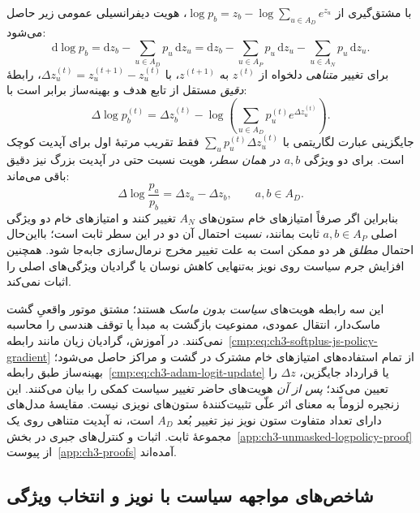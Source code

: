 با مشتق‌گیری از
$\log p_b=z_b-\log\sum_{u\in A_D}e^{z_u}$،
هویت دیفرانسیلی عمومی زیر حاصل می‌شود:
\begin{equation}\label{cmp:eq:ch3-noise-logpolicy-differential}
\boxed{
\mathrm d\log p_b=\mathrm dz_b-
\sum_{u\in A_D}p_u\,\mathrm dz_u
=\mathrm dz_b-\sum_{u\in A_P}p_u\,\mathrm dz_u
-\sum_{u\in A_N}p_u\,\mathrm dz_u .
}
\end{equation}
برای تغییر \emph{متناهی} دلخواه از $z^{(t)}$
به $z^{(t+1)}$، با
$\Delta z_u^{(t)}=z_u^{(t+1)}-z_u^{(t)}$،
رابطهٔ \emph{دقیق} مستقل از تابع هدف و بهینه‌ساز برابر است با:
\begin{equation}\label{cmp:eq:ch3-noise-logpolicy-finite}
\boxed{
\Delta\log p_b^{(t)}
=\Delta z_b^{(t)}-
\log\!\left(\sum_{u\in A_D}
p_u^{(t)}e^{\Delta z_u^{(t)}}\right).
}
\end{equation}
جایگزینی عبارت لگاریتمی با
$\sum_u p_u^{(t)}\Delta z_u^{(t)}$
فقط تقریب مرتبهٔ اول برای آپدیت کوچک است.
برای دو ویژگی $a,b$ در \emph{همان سطر}،
هویت نسبت حتی در آپدیت بزرگ نیز دقیق باقی می‌ماند:
\begin{equation}\label{cmp:eq:ch3-noise-logpolicy-ratio}
\boxed{
\Delta\log\frac{p_a}{p_b}
=\Delta z_a-\Delta z_b,\qquad a,b\in A_D .
}
\end{equation}
بنابراین اگر صرفاً امتیازهای خام ستون‌های $A_N$ تغییر کنند
و امتیازهای خام دو ویژگی اصلی $a,b\in A_P$ ثابت بمانند،
\emph{نسبت} احتمال آن دو در این سطر ثابت است؛
بااین‌حال احتمال \emph{مطلق} هر دو ممکن است به علت
تغییر مخرج نرمال‌سازی جابه‌جا شود.
همچنین افزایش جرم سیاست روی نویز به‌تنهایی
کاهش نوسان یا گرادیان ویژگی‌های اصلی را اثبات نمی‌کند.

این سه رابطه هویت‌های \emph{سیاست بدون ماسک} هستند؛
مشتق موتور واقعیِ گشت ماسک‌دار، انتقال عمودی،
ممنوعیت بازگشت به مبدأ یا توقف هندسی را محاسبه نمی‌کنند.
در آموزش، گرادیان زیان مانند
رابطه~\eqref{cmp:eq:ch3-softplus-js-policy-gradient}
از تمام استفاده‌های امتیازهای خام مشترک در گشت و مراکز حاصل
می‌شود؛ بهینه‌ساز طبق
رابطه~\eqref{cmp:eq:ch3-adam-logit-update}
یا قرارداد جایگزین، $\Delta z$ را تعیین می‌کند؛
\emph{پس از آن} هویت‌های حاضر تغییر سیاست کمکی را بیان
می‌کنند. این زنجیره لزوماً به معنای اثر علّی تثبیت‌کنندهٔ
ستون‌های نویزی نیست. مقایسهٔ مدل‌های دارای تعداد متفاوت
ستون نویز نیز تغییر بُعد $A_D$ است، نه آپدیت متناهی
روی یک مجموعهٔ ثابت. اثبات و کنترل‌های جبری در
بخش~\ref{app:ch3-unmasked-logpolicy-proof}
از پیوست~\ref{app:ch3-proofs} آمده‌اند.

\subsection{شاخص‌های مواجهه سیاست با نویز و انتخاب ویژگی}

